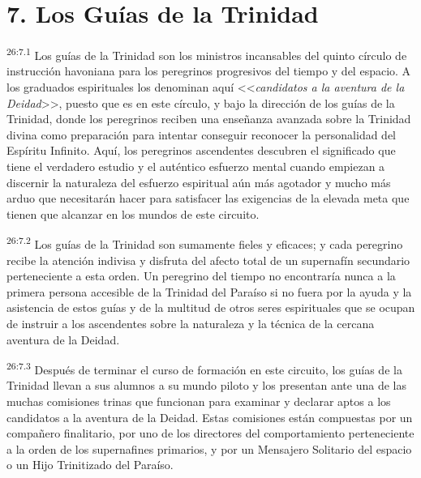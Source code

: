 \section*{7. Los Guías de la Trinidad}
\par
\textsuperscript{26:7.1} Los guías de la Trinidad son los ministros incansables del quinto círculo de instrucción havoniana para los peregrinos progresivos del tiempo y del espacio. A los graduados espirituales los denominan aquí <<\textit{candidatos a la aventura de la Deidad}>>, puesto que es en este círculo, y bajo la dirección de los guías de la Trinidad, donde los peregrinos reciben una enseñanza avanzada sobre la Trinidad divina como preparación para intentar conseguir reconocer la personalidad del Espíritu Infinito. Aquí, los peregrinos ascendentes descubren el significado que tiene el verdadero estudio y el auténtico esfuerzo mental cuando empiezan a discernir la naturaleza del esfuerzo espiritual aún más agotador y mucho más arduo que necesitarán hacer para satisfacer las exigencias de la elevada meta que tienen que alcanzar en los mundos de este circuito.

\par
\textsuperscript{26:7.2} Los guías de la Trinidad son sumamente fieles y eficaces; y cada peregrino recibe la atención indivisa y disfruta del afecto total de un supernafín secundario perteneciente a esta orden. Un peregrino del tiempo no encontraría nunca a la primera persona accesible de la Trinidad del Paraíso si no fuera por la ayuda y la asistencia de estos guías y de la multitud de otros seres espirituales que se ocupan de instruir a los ascendentes sobre la naturaleza y la técnica de la cercana aventura de la Deidad.

\par
\textsuperscript{26:7.3} Después de terminar el curso de formación en este circuito, los guías de la Trinidad llevan a sus alumnos a su mundo piloto y los presentan ante una de las muchas comisiones trinas que funcionan para examinar y declarar aptos a los candidatos a la aventura de la Deidad. Estas comisiones están compuestas por un compañero finalitario, por uno de los directores del comportamiento perteneciente a la orden de los supernafines primarios, y por un Mensajero Solitario del espacio o un Hijo Trinitizado del Paraíso.


